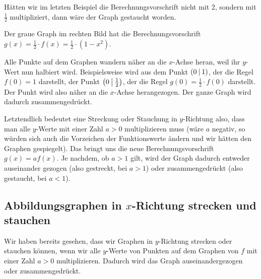 \documentclass[../../main.tex]{subfiles}
\begin{document}
\begin{example}{}
    
    Hätten wir im letzten Beispiel die Berechnungsvorschrift nicht mit 2, sondern mit $\frac{1}{2}$ multipliziert, dann wäre der Graph gestaucht worden.
    
    Der graue Graph im rechten Bild hat die Berechnungsvorschrift $g(x)=\frac{1}{2}\cdot f(x)=\frac{1}{2}\cdot (1-x^2)$.
    
    Alle Punkte auf dem Graphen wandern näher an die $x$-Achse heran, weil ihr $y$-Wert nun halbiert wird. 
    Beispielsweise wird aus dem Punkt $\left(0 \:\middle|\: 1\right)$, der die Regel $f(0)=1$ darstellt, der Punkt $\left(0 \:\middle|\: \frac{1}{2}\right)$, der die Regel $g(0)=\frac{1}{2}\cdot f(0)$ darstellt. Der Punkt wird also näher an die $x$-Achse herangezogen. Der ganze Graph wird dadurch zusammengedrückt.
\end{example}

Letztendlich bedeutet eine Streckung oder Stauchung in $y$-Richtung also, dass man alle $y$-Werte mit einer Zahl $a>0$ multiplizieren muss (wäre $a$ negativ, so würden sich auch die Vorzeichen der Funktionswerte ändern und wir hätten den Graphen gespiegelt). Das bringt uns die neue Berechnungsvorschrift $g(x)=af(x)$. Je nachdem, ob $a>1$ gilt, wird der Graph dadurch entweder auseinander gezogen (also gestreckt, bei $a>1$) oder zusammengedrückt (also gestaucht, bei $a<1$).

\subsection{Abbildungsgraphen in \texorpdfstring{$x$}{x}-Richtung strecken und stauchen}
\label{sec:abbildungen_strecken_x}

Wir haben bereits gesehen, dass wir Graphen in $y$-Richtung strecken oder stauchen können, wenn wir alle $y$-Werte von Punkten auf dem Graphen von $f$ mit einer Zahl $a>0$ multiplizieren. Dadurch wird das Graph auseinandergezogen oder zusammengedrückt.
\end{document}
